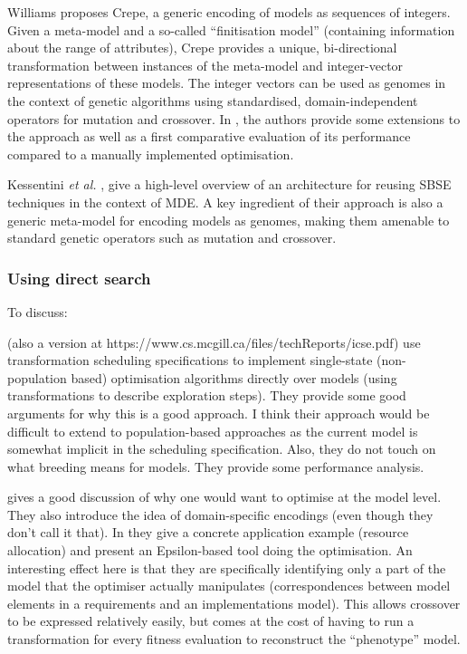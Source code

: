 			Williams \cite{Williams13} proposes Crepe, a generic encoding of models as sequences of integers. Given a meta-model and a so-called ``finitisation model'' 
			(containing information about the range of attributes), Crepe provides a unique, bi-directional transformation between instances of the meta-model and
			integer-vector representations of these models. The integer vectors can be used as genomes in the context of genetic algorithms using standardised, 
			domain-independent operators for mutation and crossover. In \cite{Efstathiou+14b}, the authors provide some extensions to the approach as well as a first
			comparative evaluation of its performance compared to a manually implemented optimisation.
			
			Kessentini \emph{et al.} \cite{Kessentini+13}, give a high-level overview of an architecture for reusing SBSE techniques in the context of MDE. A key
			ingredient of their approach is also a generic meta-model for encoding models as genomes, making them amenable to standard genetic operators such as
			mutation and crossover.

	  \subsubsection{Using direct search}

			\begin{draftlist}
				To discuss:
				\item \cite{Denil+14} (also a version at https://www.cs.mcgill.ca/files/techReports/icse.pdf) use transformation scheduling specifications to implement 
							single-state (non-population based) optimisation algorithms directly over models 
							(using transformations to describe exploration steps). They provide some good arguments for why this is a good approach. I think their approach would 
							be difficult to extend to population-based approaches as the current model is somewhat implicit in the scheduling specification. Also, they do not
							touch on what breeding means for models. They provide some performance analysis.
							
				\item \cite{BurtonPoulding13} gives a good discussion of why one would want to optimise at the model level. They also introduce the idea of domain-specific
							encodings (even though they don't call it that). In \cite{Burton+12} they give a concrete application example (resource allocation) and present an 
							Epsilon-based tool doing the optimisation. An interesting effect here is that they are specifically identifying only a part of the model that the 
							optimiser actually manipulates (correspondences between model elements in a requirements and an implementations model). This allows crossover to be
							expressed relatively easily, but comes at the cost of having to run a transformation for every fitness evaluation to reconstruct the ``phenotype''
							model.
			\end{draftlist}